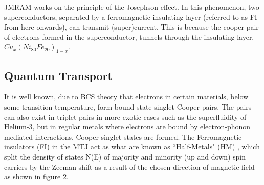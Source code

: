 \documentclass[12pt]{article}
\begin{document}
JMRAM works on the principle of the Josephson effect. In this phenomenon, two superconductors, separated by a ferromagnetic insulating layer (referred to as FI from here onwards), can transmit (super)current. This is because the cooper pair of electrons formed in the superconductor, tunnels through the insulating layer. $Cu_x(Ni_80Fe_20)_{1-x}$. 

\subsection{Quantum Transport}

It is well known, due to BCS theory \cite{BCS} that electrons in certain materials, below some transition temperature, form bound state singlet Cooper pairs. The pairs can also exist in triplet pairs in more exotic cases such as the superfluidity of Helium-3, but in regular metals where electrons are bound by electron-phonon mediated interactions, Cooper singlet states are formed. The Ferromagnetic insulators (FI) in the MTJ act as what are known as ``Half-Metals" (HM) \cite{HM}, which split the density of states N(E) of majority and minority (up and down) spin carriers by the Zeeman shift as a result of the chosen direction of magnetic field as shown in figure 2. 
\end{document}
